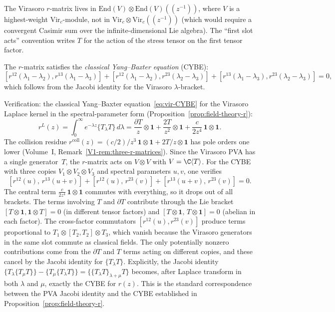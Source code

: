 \begin{remark}
The Virasoro $r$-matrix lives in $\mathrm{End}(V) \otimes \mathrm{End}(V)((z^{-1}))$, where $V$ is a highest-weight $\mathrm{Vir}_c$-module, not in $\mathrm{Vir}_c \otimes \mathrm{Vir}_c((z^{-1}))$ (which would require a convergent Casimir sum over the infinite-dimensional Lie algebra). The ``first slot acts'' convention writes $T$ for the action of the stress tensor on the first tensor factor.
\end{remark}

The $r$-matrix satisfies the \emph{classical Yang--Baxter equation} (CYBE):
\begin{equation}
[r^{12}(\lambda_1-\lambda_2), r^{13}(\lambda_1-\lambda_3)] + [r^{12}(\lambda_1-\lambda_2), r^{23}(\lambda_2-\lambda_3)] + [r^{13}(\lambda_1-\lambda_3), r^{23}(\lambda_2-\lambda_3)] = 0,
\end{equation}
which follows from the Jacobi identity for the Virasoro $\lambda$-bracket.

\begin{computation}
Verification: the classical Yang--Baxter equation~\eqref{eq:vir-CYBE}
for the Virasoro Laplace kernel in the spectral-parameter form
(Proposition~\ref{prop:field-theory-r}):
\[
r^L(z)
= \int_0^\infty e^{-\lambda z} \{T_\lambda T\}\,d\lambda
= \frac{\partial T}{z} \otimes \mathbf{1}
 + \frac{2T}{z^2} \otimes \mathbf{1}
 + \frac{c}{2z^4}\,\mathbf{1}\otimes\mathbf{1}.
\]
The collision residue $r^{\mathrm{coll}}(z) = (c/2)/z^3\,
\mathbf{1}\otimes\mathbf{1} + 2T/z\otimes\mathbf{1}$ has pole
orders one lower (Volume~I, Remark~\ref{V1-rem:three-r-matrices}).
Since the Virasoro PVA has a single generator~$T$, the $r$-matrix
acts on $V \otimes V$ with $V = \C\langle T \rangle$.
For the CYBE with three copies $V_1 \otimes V_2 \otimes V_3$ and
spectral parameters $u, v$, one verifies
\[
[r^{12}(u),\, r^{13}(u+v)]
+ [r^{12}(u),\, r^{23}(v)]
+ [r^{13}(u+v),\, r^{23}(v)]
= 0.
\]
The central term $\frac{c}{2z^4}\,\mathbf{1}\otimes\mathbf{1}$
commutes with everything, so it drops out of all brackets.
The terms involving $T$ and $\partial T$ contribute through the
Lie bracket $[T \otimes \mathbf{1}, \mathbf{1} \otimes T] = 0$
(in different tensor factors) and
$[T \otimes \mathbf{1},\, T \otimes \mathbf{1}] = 0$ (abelian in
each factor). The cross-factor commutators
$[r^{12}(u), r^{23}(v)]$ produce terms proportional to
$T_1 \otimes [T_2, T_2] \otimes T_3$, which vanish because
the Virasoro generators in the same slot commute as classical
fields. The only potentially nonzero contributions come from the
$\partial T$ and $T$ terms acting on different copies, and these
cancel by the Jacobi identity for $\{T_\lambda T\}$.
Explicitly, the Jacobi identity
$\{T_\lambda\{T_\mu T\}\} - \{T_\mu\{T_\lambda T\}\}
= \{\{T_\lambda T\}_{\lambda+\mu} T\}$
becomes, after Laplace transform in both $\lambda$ and $\mu$,
exactly the CYBE for $r(z)$. This is the standard
correspondence between the PVA Jacobi identity and the CYBE
established in Proposition~\ref{prop:field-theory-r}.
\end{computation}

